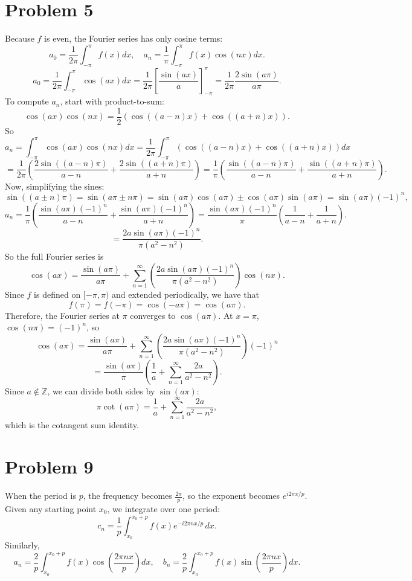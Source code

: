 \documentclass{article}
\newcommand{\bigp}[1]{\left(#1\right)}
\newcommand{\bigb}[1]{\left[#1\right]}
\newcommand{\summation}[1][0]{\sum_{n=#1}^\infty}
\begin{document}
\section*{Problem 5}
Because $f$ is even, the Fourier series has only cosine terms:
$$a_0 = \frac{1}{2\pi}\int_{-\pi}^\pi f(x)dx, \quad a_n = \frac{1}{\pi}\int_{-\pi}^\pi f(x)\cos(nx)dx.$$
$$a_0 = \frac{1}{2\pi}\int_{-\pi}^\pi \cos(ax)dx = \frac{1}{2\pi}\bigb{\frac{\sin(ax)}{a}}_{-\pi}^\pi = \frac{1}{2\pi}\frac{2\sin(a\pi)}{a\pi}.$$
To compute $a_n$, start with product-to-sum:
$$\cos(ax)\cos(nx) = \frac{1}{2}(\cos((a - n)x) + \cos((a + n)x)).$$
So
$$a_n = \int_{-\pi}^\pi \cos(ax)\cos(nx)dx = \frac{1}{2\pi}\int_{-\pi}^\pi (\cos((a - n)x) + \cos((a + n)x))dx$$
$$= \frac{1}{2\pi}\bigp{\frac{2\sin((a - n)\pi)}{a - n} + \frac{2\sin((a + n)\pi)}{a + n}} = \frac{1}{\pi}\bigp{\frac{\sin((a - n)\pi)}{a - n} + \frac{\sin((a + n)\pi)}{a + n}}.$$
Now, simplifying the sines:
$$\sin((a \pm n)\pi) = \sin(a\pi \pm n\pi) = \sin(a\pi)\cos(a\pi) \pm \cos(a\pi)\sin(a\pi) = \sin(a\pi)(-1)^n,$$
$$a_n = \frac{1}{\pi}\bigp{\frac{\sin(a\pi)(-1)^n}{a - n} + \frac{\sin(a\pi)(-1)^n}{a + n}} = \frac{\sin(a\pi)(-1)^n}{\pi}\bigp{\frac{1}{a - n} + \frac{1}{a + n}}.$$
$$= \frac{2a\sin(a\pi)(-1)^n}{\pi(a^2 - n^2)}.$$
So the full Fourier series is
$$\cos(ax) = \frac{\sin(a\pi)}{a\pi} + \summation[1]\bigp{\frac{2a\sin(a\pi)(-1)^n}{\pi(a^2 - n^2)}}\cos(nx).$$
Since $f$ is defined on $[-\pi, \pi)$ and extended periodically, we have that
$$f(\pi) = f(-\pi) = \cos(-a\pi) = \cos(a\pi).$$
Therefore, the Fourier series at $\pi$ converges to $\cos(a\pi)$. At $x = \pi$, $\cos(n\pi) = (-1)^n$, so
$$\cos(a\pi) = \frac{\sin(a\pi)}{a\pi} + \summation[1]\bigp{\frac{2a\sin(a\pi)(-1)^n}{\pi(a^2 - n^2)}}(-1)^n$$
$$= \frac{\sin(a\pi)}{\pi}\bigp{\frac{1}{a} + \summation[1] \frac{2a}{a^2 - n^2}}.$$
Since $a \notin \mathbb{Z}$, we can divide both sides by $\sin(a\pi)$:
$$\pi\cot(a\pi) = \frac{1}{a} + \summation[1] \frac{2a}{a^2 - n^2},$$
which is the cotangent sum identity.

\section*{Problem 9}
When the period is $p$, the frequency becomes $\frac{2\pi}{p}$, so the exponent becomes $e^{i2\pi x/p}$. Given any starting point $x_0$, we integrate over one period:
$$c_n = \frac{1}{p}\int_{x_0}^{x_0 + p} f(x)e^{-i2\pi n x/p}\,dx.$$
Similarly,
$$a_n = \frac{2}{p}\int_{x_0}^{x_0 + p} f(x)\cos\bigp{\frac{2\pi nx}{p}}dx, \quad b_n = \frac{2}{p}\int_{x_0}^{x_0 + p} f(x)\sin\bigp{\frac{2\pi nx}{p}}dx.$$
\end{document}
